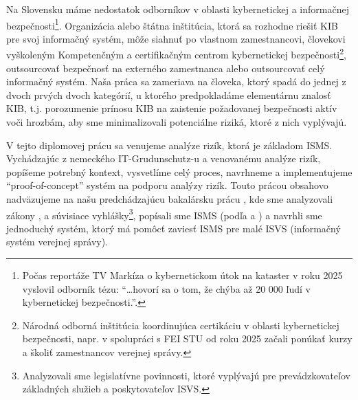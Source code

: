 Na Slovensku máme nedostatok odborníkov v oblasti kybernetickej a informačnej bezpečnosti\footnote{Počas reportáže TV Markíza o
kybernetickom útok na kataster v roku 2025 vyslovil odborník tézu: \enquote{\ldots hovorí sa o tom, že chýba až 20 000 ľudí v
kybernetickej bezpečnosti.}.}. Organizácia alebo štátna inštitúcia, ktorá sa rozhodne riešiť KIB pre svoj informačný systém, môže
siahnuť po vlastnom zamestnancovi, človekovi vyškoleným Kompetenčným a certifikačným centrom kybernetickej bezpečnosti\footnote{Národná
odborná inštitúcia koordinujúca certikáciu v oblasti kybernetickej bezpečnosti, napr. v spolupráci s FEI STU od roku 2025 začali ponúkať
kurzy a školiť zamestnancov verejnej správy.}, outsourcovať bezpečnosť na externého zamestnanca alebo outsourcovať celý informačný systém.
Naša práca sa zameriava na človeka, ktorý spadá do jednej z dvoch prvých dvoch kategórií, u ktorého predpokladáme elementárnu znalosť KIB,
t.j. porozumenie prínosu KIB na zaistenie požadovanej bezpečnosti aktív voči hrozbám, aby sme minimalizovali potenciálne riziká, ktoré z
nich vyplývajú.

V tejto diplomovej prácu sa venujeme analýze rizík, ktorá je základom ISMS. Vychádzajúc z nemeckého
IT-Grudunschutz-u a \cite{BSI3} venovanému analýze rizík, popíšeme potrebný kontext, vysvetlíme celý proces, navrhneme a implementujeme
\enquote{proof-of-concept} systém na podporu analýzy rizík. Touto prácou obsahovo nadväzujeme na našu predchádzajúcu bakalársku prácu
\cite{BP}, kde sme analyzovali zákony \cite{ZoKB}, \cite{ZoITVS} a súvisiace vyhlášky\footnote{Analyzovali sme legislatívne povinnosti, ktoré
vyplývajú pre prevádzkovateľov základných služieb a poskytovateľov ISVS.}, popísali sme ISMS (podľa \cite{BSI1} a \cite{BSI2}) a
navrhli sme jednoduchý systém, ktorý má pomôcť zaviesť ISMS pre malé ISVS (informačný systém verejnej správy).

